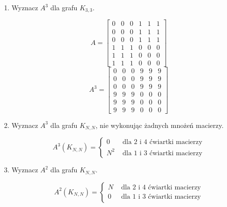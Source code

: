 \begin{enumerate}[label=\alph*)]
\item Wyznacz $A^3$ dla grafu $K_{3,3}$.

$$A=\begin{bmatrix}
0&0&0&1&1&1\\
0&0&0&1&1&1\\
0&0&0&1&1&1\\
1&1&1&0&0&0\\
1&1&1&0&0&0\\
1&1&1&0&0&0
\end{bmatrix}$$
$$A^3=\begin{bmatrix}
0&0&0&9&9&9\\
0&0&0&9&9&9\\
0&0&0&9&9&9\\
9&9&9&0&0&0\\
9&9&9&0&0&0\\
9&9&9&0&0&0
\end{bmatrix}$$
\item Wyznacz $A^3$ dla grafu $K_{N,N}$, nie wykonując żadnych mnożeń macierzy.

$$A^3(K_{N,N})=\left\{\begin{matrix}
0 & \text{ dla }2\text{ i }4 \text{ ćwiartki macierzy}\\
N^2 & \text{ dla }1\text{ i }3 \text{ ćwiartki macierzy}
\end{matrix}\right.$$
\item Wyznacz $A^2$ dla grafu $K_{N,N}$.

$$A^2(K_{N,N})=\left\{\begin{matrix}
N & \text{ dla }2\text{ i }4 \text{ ćwiartki macierzy}\\
0 & \text{ dla }1\text{ i }3 \text{ ćwiartki macierzy}
\end{matrix}\right.$$
\end{enumerate}

